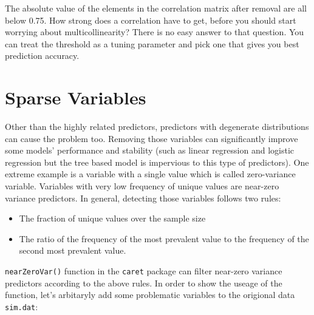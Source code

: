 \documentclass[12pt,]{krantz}
\newenvironment{Shaded}{\begin{snugshade}}{\end{snugshade}}
\newcommand{\KeywordTok}[1]{\textcolor[rgb]{0.13,0.29,0.53}{\textbf{{#1}}}}
\newcommand{\DecValTok}[1]{\textcolor[rgb]{0.00,0.00,0.81}{{#1}}}
\newcommand{\CommentTok}[1]{\textcolor[rgb]{0.56,0.35,0.01}{\textit{{#1}}}}
\newcommand{\NormalTok}[1]{{#1}}
\providecommand{\tightlist}{%
  \setlength{\itemsep}{0pt}\setlength{\parskip}{0pt}}
\theoremstyle{definition}
\theoremstyle{definition}
\theoremstyle{remark}
\begin{document}
The absolute value of the elements in the correlation matrix after
removal are all below 0.75. How strong does a correlation have to get,
before you should start worrying about multicollinearity? There is no
easy answer to that question. You can treat the threshold as a tuning
parameter and pick one that gives you best prediction accuracy.

\section{Sparse Variables}\label{sparse-variables}

Other than the highly related predictors, predictors with degenerate
distributions can cause the problem too. Removing those variables can
significantly improve some models' performance and stability (such as
linear regression and logistic regression but the tree based model is
impervious to this type of predictors). One extreme example is a
variable with a single value which is called zero-variance variable.
Variables with very low frequency of unique values are near-zero
variance predictors. In general, detecting those variables follows two
rules:

\begin{itemize}
\tightlist
\item
  The fraction of unique values over the sample size
\item
  The ratio of the frequency of the most prevalent value to the
  frequency of the second most prevalent value.
\end{itemize}

\texttt{nearZeroVar()} function in the \texttt{caret} package can filter
near-zero variance predictors according to the above rules. In order to
show the useage of the function, let's arbitaryly add some problematic
variables to the origional data \texttt{sim.dat}:

\begin{Shaded}
\end{Shaded}
\end{document}
